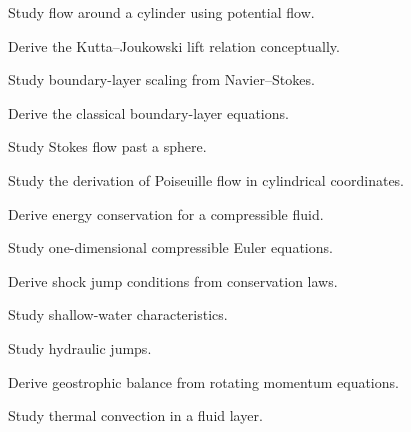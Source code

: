 \begin{exercise}[4]
Study flow around a cylinder using potential flow.
\end{exercise}

\begin{exercise}[4]
Derive the Kutta--Joukowski lift relation conceptually.
\end{exercise}

\begin{exercise}[4]
Study boundary-layer scaling from Navier--Stokes.
\end{exercise}

\begin{exercise}[4]
Derive the classical boundary-layer equations.
\end{exercise}

\begin{exercise}[4]
Study Stokes flow past a sphere.
\end{exercise}

\begin{exercise}[4]
Study the derivation of Poiseuille flow in cylindrical coordinates.
\end{exercise}

\begin{exercise}[4]
Derive energy conservation for a compressible fluid.
\end{exercise}

\begin{exercise}[4]
Study one-dimensional compressible Euler equations.
\end{exercise}

\begin{exercise}[4]
Derive shock jump conditions from conservation laws.
\end{exercise}

\begin{exercise}[4]
Study shallow-water characteristics.
\end{exercise}

\begin{exercise}[4]
Study hydraulic jumps.
\end{exercise}

\begin{exercise}[4]
Derive geostrophic balance from rotating momentum equations.
\end{exercise}

\begin{exercise}[4]
Study thermal convection in a fluid layer.
\end{exercise}

